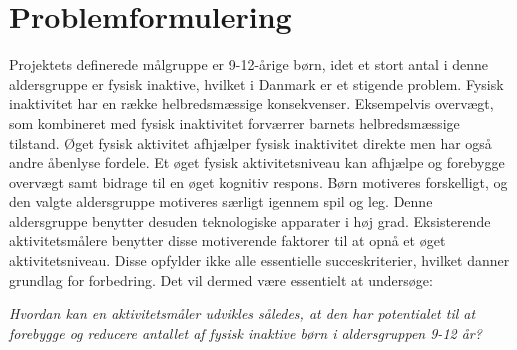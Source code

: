 \section{Problemformulering}\label{Problemformulering}
Projektets definerede målgruppe er 9-12-årige børn, idet et stort antal i denne aldersgruppe er fysisk inaktive, hvilket i Danmark er et stigende problem. Fysisk inaktivitet har en række helbredsmæssige konsekvenser. Eksempelvis overvægt, som kombineret med fysisk inaktivitet forværrer barnets helbredsmæssige tilstand. Øget fysisk aktivitet afhjælper fysisk inaktivitet direkte men har også andre åbenlyse fordele. Et øget fysisk aktivitetsniveau kan afhjælpe og forebygge overvægt samt bidrage til en øget kognitiv respons. Børn motiveres forskelligt, og den valgte aldersgruppe motiveres særligt igennem spil og leg. Denne aldersgruppe benytter desuden teknologiske apparater i høj grad. Eksisterende aktivitetsmålere benytter disse motiverende faktorer til at opnå et øget aktivitetsniveau. Disse opfylder ikke alle essentielle succeskriterier, hvilket danner grundlag for forbedring. Det vil dermed være essentielt at undersøge:

\begin{center}
\textit{Hvordan kan en aktivitetsmåler udvikles således, at den har potentialet til at forebygge og reducere antallet af fysisk inaktive børn i aldersgruppen 9-12 år?}
\end{center}


